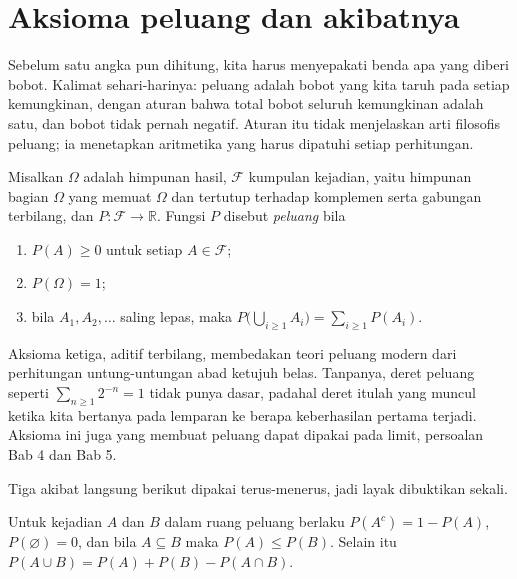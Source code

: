 \section{Aksioma peluang dan akibatnya}

Sebelum satu angka pun dihitung, kita harus menyepakati benda apa yang diberi bobot.
Kalimat sehari-harinya: peluang adalah bobot yang kita taruh pada setiap kemungkinan,
dengan aturan bahwa total bobot seluruh kemungkinan adalah satu, dan bobot tidak pernah
negatif. Aturan itu tidak menjelaskan arti filosofis peluang; ia menetapkan aritmetika yang
harus dipatuhi setiap perhitungan.



\begin{definisi}
Misalkan $\Omega$ adalah himpunan hasil, $\mathcal{F}$ kumpulan kejadian, yaitu
himpunan bagian $\Omega$ yang memuat $\Omega$ dan tertutup terhadap komplemen serta
gabungan terbilang, dan $P\colon\mathcal{F}\to\mathbb{R}$. Fungsi $P$ disebut
\emph{peluang} bila
\begin{enumerate}
  \item $P(A)\ge 0$ untuk setiap $A\in\mathcal{F}$;
  \item $P(\Omega)=1$;
  \item bila $A_{1},A_{2},\dots$ saling lepas, maka
        $P\bigl(\bigcup_{i\ge 1}A_{i}\bigr)=\sum_{i\ge 1}P(A_{i})$.
\end{enumerate}
\end{definisi}

Aksioma ketiga, aditif terbilang, membedakan teori peluang modern dari perhitungan
untung-untungan abad ketujuh belas. Tanpanya, deret peluang seperti
$\sum_{n\ge 1}2^{-n}=1$ tidak punya dasar, padahal deret itulah yang muncul ketika kita
bertanya pada lemparan ke berapa keberhasilan pertama terjadi. Aksioma ini juga yang
membuat peluang dapat dipakai pada limit, persoalan Bab 4 dan Bab 5.

Tiga akibat langsung berikut dipakai terus-menerus, jadi layak dibuktikan sekali.

\begin{proposisi}
Untuk kejadian $A$ dan $B$ dalam ruang peluang berlaku
$P(A^{c})=1-P(A)$, $P(\varnothing)=0$, dan bila $A\subseteq B$ maka
$P(A)\le P(B)$. Selain itu
$P(A\cup B)=P(A)+P(B)-P(A\cap B)$.
\end{proposisi}

